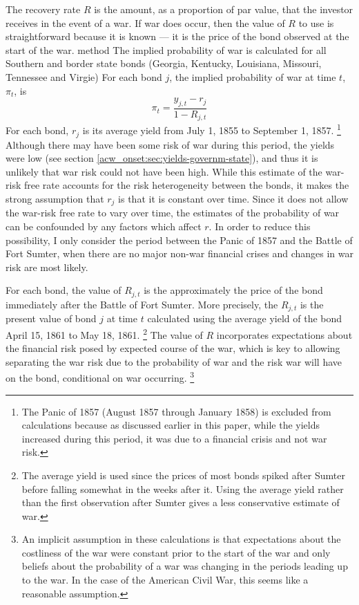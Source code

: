 The recovery rate $R$ is the amount, as a proportion of par value, that the investor receives in the event of a war.
If war does occur, then the value of $R$ to use is straightforward because it is known --- it is the price of the bond observed at the start of the war.
 method The implied probability of war is calculated for all Southern and border state bonds (Georgia, Kentucky, Louisiana, Missouri, Tennessee and Virgie)
For each bond $j$, the implied probability of war at time $t$, $\pi_{t}$, is
\begin{equation}
  \pi_{t} = \frac{y_{j,t} - r_{j}}{1 - R_{j,t}}
\end{equation}
For each bond, $r_{j}$ is its average yield from July  1, 1855 to September  1, 1857.%
\footnote{
  The Panic of 1857 (August 1857 through January 1858) is excluded from calculations because as discussed earlier in this paper, while the yields increased during this period, it was due to a financial crisis and not war risk.
}
Although there may have been some risk of war during this period, the yields were low (see section \ref{acw_onset:sec:yields-governm-state}), and thus it is unlikely that war risk could not have been high.
While this estimate of the war-risk free rate accounts for the risk heterogeneity between the bonds, it makes the strong assumption that $r_{j}$ is that it is constant over time.
Since it does not allow the war-risk free rate to vary over time, the estimates of the probability of war can be confounded by any factors which affect $r$.
In order to reduce this possibility, I only consider the period between the Panic of 1857 and the Battle of Fort Sumter, when there are no major non-war financial crises and changes in war risk are most likely.

For each bond, the value of $R_{j,t}$ is the approximately the price of the bond immediately after the Battle of Fort Sumter.
More precisely, the $R_{j,t}$ is the present value of bond $j$ at time $t$ calculated using the average yield of the bond April 15, 1861 to May 18, 1861.%
\footnote{The average yield is used since the prices of most bonds spiked after Sumter before falling somewhat in the weeks after it.
  Using the average yield rather than the first observation after Sumter gives a less conservative estimate of war.
}
The value of $R$ incorporates expectations about the financial risk posed by expected course of the war, which is key to allowing separating the war risk due to the probability of war and the risk war will have on the bond, conditional on war occurring.%
\footnote{
  An implicit assumption in these calculations is that expectations about the costliness of the war were constant prior to the start of the war and only beliefs about the probability of a war was changing in the periods leading up to the war.
  In the case of the American Civil War, this seems like a reasonable assumption.
}

